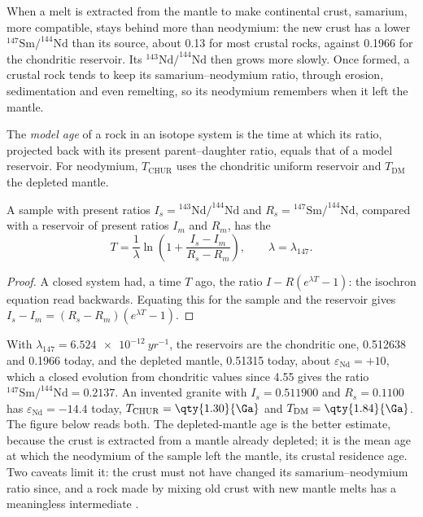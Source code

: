 When a melt is extracted from the mantle to make continental crust, samarium,
more compatible, stays behind more than neodymium: the new crust has a lower
$^{147}\mathrm{Sm}/^{144}\mathrm{Nd}$ than its source, about 0.13 for most
crustal rocks, against 0.1966 for the chondritic reservoir. Its
$^{143}\mathrm{Nd}/^{144}\mathrm{Nd}$ then grows more slowly. Once formed, a
crustal rock tends to keep its samarium--neodymium ratio, through erosion,
sedimentation and even remelting, so its neodymium remembers when it left the
mantle.

\begin{definition}\label{def:b3:advanced-geochronology:model-age}
The \emph{model age} of a rock in an isotope system is the
time at which its ratio, projected back with its present parent--daughter
ratio, equals that of a model reservoir. For neodymium, $T_{\mathrm{CHUR}}$
uses the chondritic uniform reservoir and $T_{\mathrm{DM}}$ the depleted
mantle.
\end{definition}

\begin{theorem}\label{thm:b3:advanced-geochronology:model-age}
A sample with present ratios $I_s = {}^{143}\mathrm{Nd}/^{144}\mathrm{Nd}$ and
$R_s = {}^{147}\mathrm{Sm}/^{144}\mathrm{Nd}$, compared with a reservoir of
present ratios $I_m$ and $R_m$, has the 
\[
T = \frac1\lambda\ln\left(1 + \frac{I_s - I_m}{R_s - R_m}\right),
\qquad \lambda = \lambda_{147}.
\]
\end{theorem}

\begin{proof}
A closed system had, a time $T$ ago, the ratio $I - R(e^{\lambda T} - 1)$: the
isochron equation read backwards. Equating this for the sample and the
reservoir gives $I_s - I_m = (R_s - R_m)(e^{\lambda T} - 1)$.
\end{proof}

With $\lambda_{147} = \qty{6.524e-12}{yr^{-1}}$, the reservoirs are the
chondritic one, 0.512638 and 0.1966 today, and the depleted mantle,
0.51315 today, about $\varepsilon_{\mathrm{Nd}} = +10$, which a closed
evolution from chondritic values since \qty{4.55}{\Ga} gives the ratio
$^{147}\mathrm{Sm}/^{144}\mathrm{Nd} = 0.2137$. An invented granite with
$I_s = 0.511900$ and $R_s = 0.1100$ has $\varepsilon_{\mathrm{Nd}} = -14.4$
today, $T_{\mathrm{CHUR}} = \qty{1.30}{\Ga}$ and $T_{\mathrm{DM}} =
\qty{1.84}{\Ga}$. The figure below reads both. The depleted-mantle age is the
better estimate, because the crust is extracted from a mantle already
depleted; it is the mean age at which the neodymium of the sample left the
mantle, its crustal residence age. Two caveats limit it: the crust must not
have changed its samarium--neodymium ratio since, and a rock made by mixing
old crust with new mantle melts has a meaningless intermediate .

